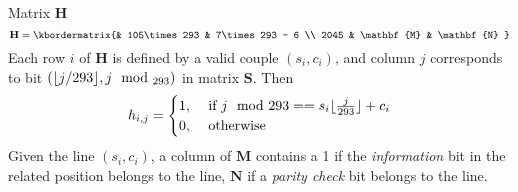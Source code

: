 \documentclass[pdf]
          {beamer}
\DeclarePairedDelimiter{\floor}{\lfloor}{\rfloor}
\begin{document}
\begin{frame}{Matrix $\mathbf{H}$}
	\begin{equation*}
		\mathbf{H} = 
			\kbordermatrix{%
					& 105\times293 & 7\times293 - 6 \\
				2045 & \mathbf{M} & \mathbf{N}
			}
	\end{equation*}
	Each row $i$ of $\mathbf{H}$ is defined by a valid couple $(s_i, c_i)$, and column $j$ corresponds to bit $(\floor{j/293}, j\mod_{293})$ in matrix $\mathbf{S}$. Then
	\begin{equation*}
		h_{i, j} = \begin{cases}
			1, &\text{ if }j\mod{293} == s_i\floor{\frac{j}{293}} + c_i\\
			0, &\text{ otherwise}\\
		\end{cases}
	\end{equation*}
	Given the line $(s_i, c_i)$, a column of $\mathbf{M}$ contains a 1 if the \textit{information} bit in the related position belongs to the line, $\mathbf{N}$ if a \textit{parity check} bit belongs to the line.
\end{frame}
\end{document}

